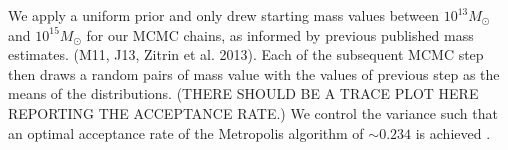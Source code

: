 We apply a uniform prior and only drew starting mass values between
$10^{13} M_\odot$ and $10^{15} M_\odot$ for our MCMC
chains, as informed by previous published mass estimates. (M11, J13, Zitrin et al. 2013). Each of the subsequent MCMC step then
draws a random pairs of mass value with the values of
previous step as the means of the distributions. 
(THERE SHOULD BE A TRACE PLOT HERE REPORTING THE ACCEPTANCE RATE.)
We control the variance such that an optimal acceptance rate of the
Metropolis algorithm of
$\sim0.234$ \citep{Roberts97} is achieved .
 
